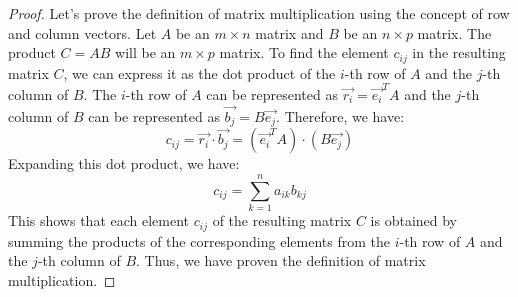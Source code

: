 \begin{proof}
    Let's prove the definition of matrix multiplication using the concept of row and column vectors. Let \( A \) be an \( m \times n \) matrix and \( B \) be an \( n \times p \) matrix. The product \( C = AB \) will be an \( m \times p \) matrix. To find the element \( c_{ij} \) in the resulting matrix \( C \), we can express it as the dot product of the \( i \)-th row of \( A \) and the \( j \)-th column of \( B \). The \( i \)-th row of \( A \) can be represented as \( \vec{r_i} = \vec{e_i}^T A \) and the \( j \)-th column of \( B \) can be represented as \( \vec{b_j} = B \vec{e_j} \). Therefore, we have:
    \[
        c_{ij} = \vec{r_i} \cdot \vec{b_j} = (\vec{e_i}^T A) \cdot (B \vec{e_j})
    \]
    Expanding this dot product, we have:
    \[
        c_{ij} = \sum_{k=1}^{n} a_{ik} b_{kj}
    \]
    This shows that each element \( c_{ij} \) of the resulting matrix \( C \) is obtained by summing the products of the corresponding elements from the \( i \)-th row of \( A \) and the \( j \)-th column of \( B \). Thus, we have proven the definition of matrix multiplication.
\end{proof}

